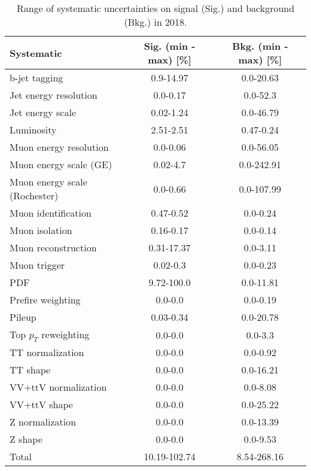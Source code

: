 \begin{table}[htbp]
\begin{center}
\caption{Range of systematic uncertainties on signal (Sig.) and background (Bkg.) in 2018.}
\begin{tabular}{lcc}
\hline\hline
Systematic					&  Sig. (min - max) [\%] &  Bkg. (min - max) [\%]  \\ \hline
b-jet tagging					& 0.9-14.97 & 0.0-20.63 \\
Jet energy resolution  		& 0.0-0.17 & 0.0-52.3 \\
Jet energy scale       		& 0.02-1.24 & 0.0-46.79 \\
Luminosity		 			& 2.51-2.51 & 0.47-0.24 \\
Muon energy resolution 		& 0.0-0.06 & 0.0-56.05 \\
Muon energy scale (GE)    	& 0.02-4.7 & 0.0-242.91 \\
Muon energy scale (Rochester)	& 0.0-0.66 & 0.0-107.99 \\
Muon identification    		& 0.47-0.52 & 0.0-0.24 \\
Muon isolation         		& 0.16-0.17 & 0.0-0.14 \\
Muon reconstruction    		& 0.31-17.37 & 0.0-3.11 \\
Muon trigger           		& 0.02-0.3 & 0.0-0.23 \\
PDF                    		& 9.72-100.0 & 0.0-11.81 \\
Prefire weighting				& 0.0-0.0 & 0.0-0.19 \\
Pileup                		& 0.03-0.34 & 0.0-20.78 \\
Top $p_T$ reweighting     	& 0.0-0.0 & 0.0-3.3 \\
TT normalization       		& 0.0-0.0 & 0.0-0.92 \\
TT shape               		& 0.0-0.0 & 0.0-16.21 \\
VV+ttV normalization          & 0.0-0.0 & 0.0-8.08 \\
VV+ttV shape          		& 0.0-0.0 & 0.0-25.22 \\
Z normalization        		& 0.0-0.0 & 0.0-13.39 \\
Z shape                		& 0.0-0.0 & 0.0-9.53 \\
Total                 		& 10.19-102.74 & 8.54-268.16 \\ \hline\hline
\end{tabular}
\label{tab:SysRanges2018}
\end{center}
\end{table}

